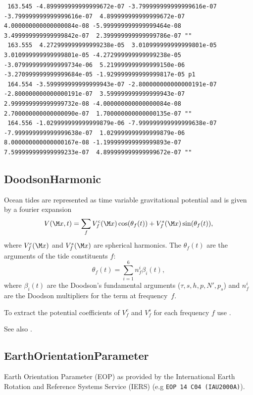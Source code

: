\begin{verbatim}
 163.545 -4.899999999999999672e-07 -3.799999999999999616e-07 -3.799999999999999616e-07  4.899999999999999672e-07  4.000000000000000084e-08 -5.999999999999999464e-08  3.499999999999999842e-07  2.399999999999999786e-07 ""
 163.555  4.272999999999999238e-05  3.010999999999999801e-05  3.010999999999999801e-05 -4.272999999999999238e-05 -3.079999999999999734e-06  5.219999999999999150e-06 -3.270999999999999684e-05 -1.929999999999999817e-05 p1
 164.554 -3.599999999999999943e-07 -2.800000000000000191e-07 -2.800000000000000191e-07  3.599999999999999943e-07  2.999999999999999732e-08 -4.000000000000000084e-08  2.700000000000000090e-07  1.700000000000000135e-07 ""
 164.556 -1.029999999999999879e-06 -7.999999999999999638e-07 -7.999999999999999638e-07  1.029999999999999879e-06  8.000000000000000167e-08 -1.199999999999999893e-07  7.599999999999999233e-07  4.899999999999999672e-07 ""
\end{verbatim}


\subsection{DoodsonHarmonic}\label{general.fileFormat:doodsonHarmonic}
Ocean tides are represented as time variable gravitational potential
and is given by a fourier expansion
\begin{equation}
V(\M x,t) = \sum_{f} V_f^c(\M x)\cos(\theta_f(t)) + V_f^s(\M x)\sin(\theta_f(t)),
\end{equation}
where $V_f^c(\M x)$ and $V_f^s(\M x)$ are spherical harmonics.
The $\theta_f(t)$ are the arguments of the tide constituents $f$:
\begin{equation}
\theta_f(t) = \sum_{i=1}^6 n_f^i\beta_i(t),
\end{equation}
where $\beta_i(t)$ are the Doodson's fundamental arguments ($\tau,s,h,p,N',p_s$) and $n_f^i$
are the Doodson multipliers for the term at frequency~$f$.

To extract the potential coefficients of $V_f^c$ and $V_f^s$
for each frequency $f$ use .

See also .


\subsection{EarthOrientationParameter}\label{general.fileFormat:earthOrientationParameter}
Earth Orientation Parameter (EOP) as provided by the International Earth Rotation and Reference Systems Service (IERS) (e.g \verb|EOP 14 C04 (IAU2000A)|).

